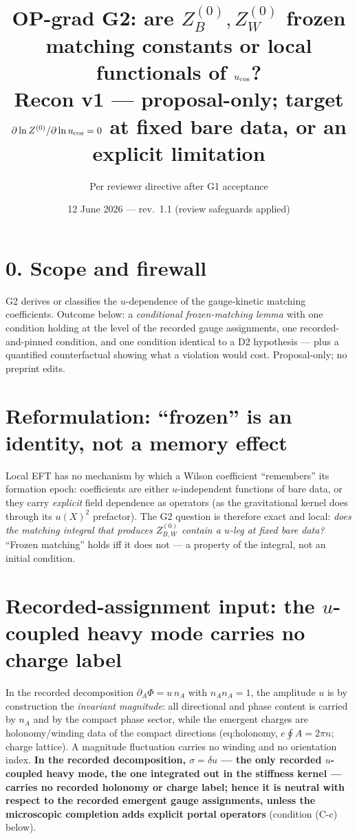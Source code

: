 \documentclass[11pt,a4paper]{article}
\title{\textbf{OP-grad G2: are $Z_B^{(0)},Z_W^{(0)}$ frozen matching constants
or local functionals of $u_{\rm cos}$?}\\\large Recon v1 --- proposal-only;
target $\partial\ln Z^{(0)}/\partial\ln u_{\rm cos}=0$ at fixed bare data, or
an explicit limitation}
\author{Per reviewer directive after G1 acceptance}
\date{12 June 2026 --- rev.~1.1 (review safeguards applied)}
\begin{document}
\maketitle

\section*{0. Scope and firewall}
G2 derives or classifies the $u$-dependence of the gauge-kinetic matching
coefficients. Outcome below: a \emph{conditional frozen-matching lemma} with
one condition holding at the level of the recorded gauge assignments, one
recorded-and-pinned condition, and one condition identical to a D2 hypothesis --- plus a
quantified counterfactual showing what a violation would cost. Proposal-only;
no preprint edits.

\section{Reformulation: ``frozen'' is an identity, not a memory effect}
Local EFT has no mechanism by which a Wilson coefficient ``remembers'' its
formation epoch: coefficients are either $u$-independent functions of bare
data, or they carry \emph{explicit} field dependence as operators (as the
gravitational kernel does through its $u(X)^2$ prefactor). The G2 question is
therefore exact and local: \emph{does the matching integral that produces
$Z_{B,W}^{(0)}$ contain a $u$-leg at fixed bare data?} ``Frozen matching''
holds iff it does not --- a property of the integral, not an initial
condition.

\section{Recorded-assignment input: the $u$-coupled heavy mode carries no
charge label}
In the recorded decomposition $\partial_A\Phi=u\,n_A$ with $n_An_A=1$, the
amplitude $u$ is by construction the \emph{invariant magnitude}: all
directional and phase content is carried by $n_A$ and by the compact phase
sector, while the emergent charges are holonomy/winding data of the compact
directions (eq:holonomy, $e\oint A=2\pi n$; charge lattice). A magnitude
fluctuation carries no winding and no orientation index. \textbf{In the
recorded decomposition, $\sigma=\delta u$ --- the only recorded $u$-coupled
heavy mode, the one integrated out in the stiffness kernel --- carries no
recorded holonomy or charge label; hence it is neutral with respect to the
recorded emergent gauge assignments, unless the microscopic completion adds
explicit portal operators} (condition (C-c) below).
\end{document}
